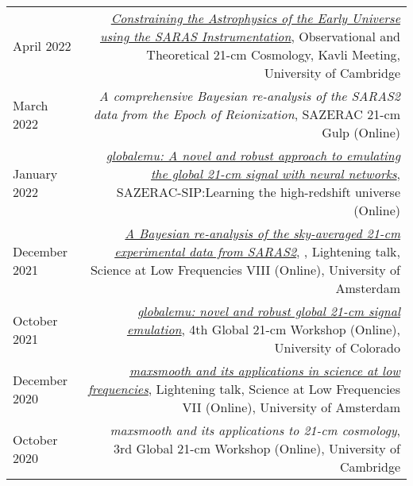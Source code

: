 \documentclass{article}
\begin{document}
\begin{tabular}{L!{\vrule}R}
	April 2022 & \href{https://www.kicc.cam.ac.uk/events/kavli-science-themed-meetings/observational-and-theoretical-21-cm-cosmology}{\textit{Constraining the Astrophysics of the Early Universe using the SARAS Instrumentation}}, Observational and Theoretical 21-cm Cosmology, Kavli Meeting, University of Cambridge \\
	March 2022 & \textit{A comprehensive Bayesian re-analysis of the SARAS2 data from the Epoch of Reionization}, SAZERAC 21-cm Gulp (Online) \\
	January 2022 & \href{https://www.youtube.com/watch?v=BFwia93NuAc&list=PLp95u5tgS_YUkFaLATBQpLajJzO5ljN5u&index=5}{\textit{globalemu: A novel and robust approach to emulating the global 21-cm signal with neural networks}}, SAZERAC-SIP:Learning the high-redshift universe (Online) \\
	December 2021 & \href{https://www.youtube.com/watch?v=93KCp7rHcGA&list=PLZL7YmXBBHPDCyNfJcWwP78GgacY_Og4E&index=23}{\textit{A Bayesian re-analysis of the sky-averaged 21-cm experimental data from SARAS2}}, , Lightening talk, Science at Low Frequencies VIII (Online), University of Amsterdam \\
	October 2021 & \href{https://www.youtube.com/watch?v=862NuVyF33k&list=PLF7c7ri2hrnGlwbn4JLc0PWbncSeARdTP&index=4}{\textit{globalemu: novel and robust global 21-cm signal emulation}}, 4th Global 21-cm Workshop (Online), University of Colorado \\
	December 2020 & \href{https://www.youtube.com/watch?v=Yw6_IInwTNE}{\textit{maxsmooth and its applications in science at low frequencies}}, Lightening talk, Science at Low Frequencies VII (Online), University of Amsterdam \\
	October 2020 & \textit{maxsmooth and its applications to 21-cm cosmology}, 3rd Global 21-cm Workshop (Online), University of Cambridge \\
\end{tabular}
\end{document}

